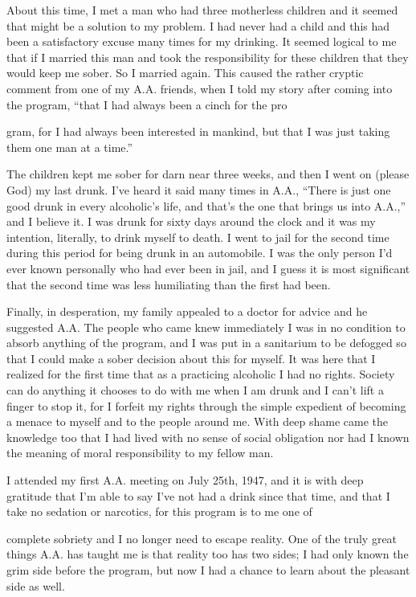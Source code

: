 About this time, I met a man who had three motherless children and it seemed that might be a solution to my problem. I had never had a child and this had been a satisfactory excuse many times for my drinking. It seemed logical to me that if I married this man and took the responsibility for these children that they would keep me sober. So I married again. This caused the rather cryptic comment from one of my A.A. friends, when I told my story after coming into the program, “that I had always been a cinch for the pro

gram, for I had always been interested in mankind, but that I was just taking them one man at a time.”

The children kept me sober for darn near three weeks, and then I went on (please God) my last drunk. I’ve heard it said many times in A.A., “There is just one good drunk in every alcoholic’s life, and that’s the one that brings us into A.A.,” and I believe it. I was drunk for sixty days around the clock and it was my intention, literally, to drink myself to death. I went to jail for the second time during this period for being drunk in an automobile. I was the only person I’d ever known personally who had ever been in jail, and I guess it is most significant that the second time was less humiliating than the first had been.

Finally, in desperation, my family appealed to a doctor for advice and he suggested A.A. The people who came knew immediately I was in no condition to absorb anything of the program, and I was put in a sanitarium to be defogged so that I could make a sober decision about this for myself. It was here that I realized for the first time that as a practicing alcoholic I had no rights. Society can do anything it chooses to do with me when I am drunk and I can’t lift a finger to stop it, for I forfeit my rights through the simple expedient of becoming a menace to myself and to the people around me. With deep shame came the knowledge too that I had lived with no sense of social obligation nor had I known the meaning of moral responsibility to my fellow man.

I attended my first A.A. meeting on July 25th, 1947, and it is with deep gratitude that I’m able to say I’ve not had a drink since that time, and that I take no sedation or narcotics, for this program is to me one of

complete sobriety and I no longer need to escape reality. One of the truly great things A.A. has taught me is that reality too has two sides; I had only known the grim side before the program, but now I had a chance to learn about the pleasant side as well.

